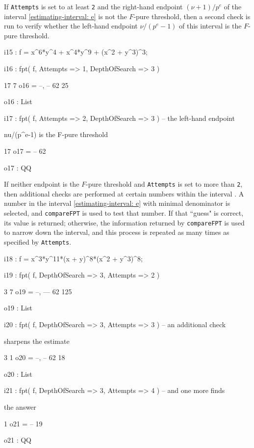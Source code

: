 \documentclass{amsart}
\begin{document}
If  {\tt Attempts} is set to at least {\tt 2} and the right-hand endpoint $(\nu+1)/p^e$ of the interval \eqref{estimating-interval: e} is not the $F$-pure threshold, then a second check is run to verify whether the left-hand endpoint $\nu/(p^e-1)$ of this interval is the $F$-pure threshold.

{\small
{}
\begin{MyVerbatim}

i15 : f = x^6*y^4 + x^4*y^9 + (x^2 + y^3)^3;

i16 : fpt( f, Attempts => 1, DepthOfSearch => 3 )

       17   7
o16 = {--, --}
       62  25

o16 : List

i17 : fpt( f, Attempts => 2, DepthOfSearch => 3 ) -- the left-hand endpoint 

      nu/(p^e-1) is the F-pure threshold

      17
o17 = --
      62

o17 : QQ

\end{MyVerbatim}
}

            If neither endpoint is the $F$-pure threshold and {\tt Attempts} is set to more than {\tt 2}, then  additional checks are performed at certain numbers within the interval .  A number in the interval \eqref{estimating-interval: e} with minimal denominator is selected, and {\tt compareFPT} is used to test that number. If that ``guess" is correct, its value is returned; otherwise, the information returned by {\tt compareFPT} is used to narrow down the interval, and this process is repeated as many times as specified by {\tt Attempts}.

{\small
{}
\begin{MyVerbatim}

i18 : f = x^3*y^11*(x + y)^8*(x^2 + y^3)^8;

i19 : fpt( f, DepthOfSearch => 3, Attempts => 2 )

        3   7
o19 = {--, ---}
       62  125

o19 : List

i20 : fpt( f, DepthOfSearch => 3, Attempts => 3 ) -- an additional check 

      sharpens the estimate
 
        3   1
o20 = {--, --}
       62  18

o20 : List

i21 : fpt( f, DepthOfSearch => 3, Attempts => 4 ) -- and one more finds 

      the answer

       1
o21 = --
      19

o21 : QQ

\end{MyVerbatim}
}
\end{document}

